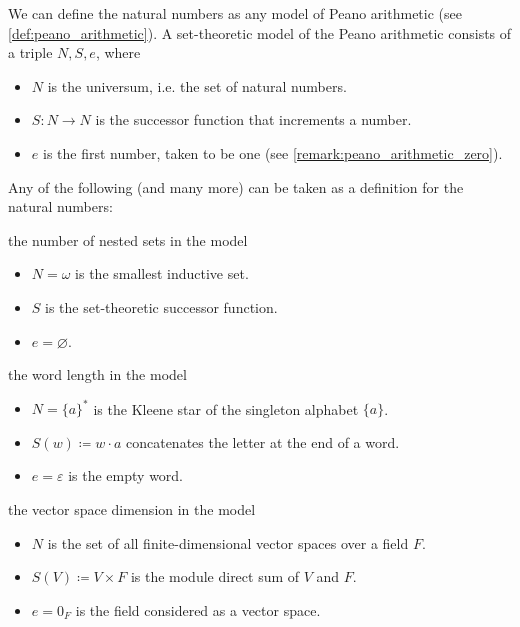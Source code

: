 \begin{definition}\label{def:natural_numbers}
  We can define the natural numbers as any model of Peano arithmetic (see \cref{def:peano_arithmetic}). A set-theoretic model of the Peano arithmetic consists of a triple \( N, S, e \), where
  \begin{itemize}
    \item \( N \) is the universum, i.e. the set of natural numbers.
    \item \( S: N \to N \) is the successor function that increments a number.
    \item \( e \) is the first number, taken to be one (see \cref{remark:peano_arithmetic_zero}).
  \end{itemize}

  Any of the following (and many more) can be taken as a definition for the natural numbers:
  \begin{defenum}
     the number of nested sets in the model
    \begin{itemize}
      \item \( N = \omega \) is the smallest inductive set.
      \item \( S \) is the set-theoretic successor function.
      \item \( e = \varnothing \).
    \end{itemize}

     the word length in the model
    \begin{itemize}
      \item \( N = \{ a \}^{*} \) is the Kleene star of the singleton alphabet \( \{ a \} \).
      \item \( S(w) \coloneqq w \cdot a \) concatenates the letter at the end of a word.
      \item \( e = \varepsilon \) is the empty word.
    \end{itemize}

     the vector space dimension in the model
    \begin{itemize}
      \item \( N \) is the set of all finite-dimensional vector spaces over a field \( F \).
      \item \( S(V) \coloneqq V \times F \) is the module direct sum of \( V \) and \( F \).
      \item \( e = 0_F \) is the field considered as a vector space.
    \end{itemize}
  \end{defenum}
\end{definition}

